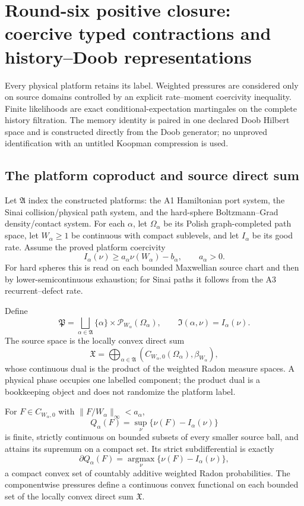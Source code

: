 \section{Round-six positive closure: coercive typed contractions and history--Doob representations}
\label{sec:r6-c2}

Every physical platform retains its label.  Weighted pressures are considered
only on source domains controlled by an explicit rate--moment coercivity
inequality.  Finite likelihoods are exact conditional-expectation martingales
on the complete history filtration.  The memory identity is paired in one
declared Doob Hilbert space and is constructed directly from the Doob
generator; no unproved identification with an untitled Koopman compression is
used.

\subsection{The platform coproduct and source direct sum}

Let \(\mathfrak A\) index the constructed platforms: the A1 Hamiltonian port
system, the Sinai collision/physical path system, and the hard-sphere
Boltzmann--Grad density/contact system.  For each \(\alpha\), let
\(\Omega_\alpha\) be its Polish graph-completed path space, let
\(W_\alpha\ge1\) be continuous with compact sublevels, and let
\(I_\alpha\) be its good rate.  Assume the proved platform coercivity
\[
I_\alpha(\nu)\ge a_\alpha\nu(W_\alpha)-b_\alpha,
\qquad a_\alpha>0.
\]
For hard spheres this is read on each bounded Maxwellian source chart and
then by lower-semicontinuous exhaustion; for Sinai paths it follows from the
A3 recurrent--defect rate.

Define
\[
\mathfrak P=\bigsqcup_{\alpha\in\mathfrak A}
\{\alpha\}\times\mathcal P_{W_\alpha}(\Omega_\alpha),
\qquad
\mathfrak I(\alpha,\nu)=I_\alpha(\nu).
\]
The source space is the locally convex direct sum
\[
\mathfrak X=\bigoplus_{\alpha\in\mathfrak A}
(C_{W_\alpha,0}(\Omega_\alpha),\beta_{W_\alpha}),
\]
whose continuous dual is the product of the weighted Radon measure spaces.
A physical phase occupies one labelled component; the product dual is a
bookkeeping object and does not randomize the platform label.

\begin{theorem}
\label{thm:r6-c2-strict}
For \(F\in C_{W_\alpha,0}\) with
\(\|F/W_\alpha\|_\infty<a_\alpha\),
\[
Q_\alpha(F)=\sup_\nu\{\nu(F)-I_\alpha(\nu)\}
\]
is finite, strictly continuous on bounded subsets of every smaller source
ball, and attains its supremum on a compact set.  Its strict subdifferential is
exactly
\[
\partial Q_\alpha(F)=
\operatorname*{argmax}_\nu
\{\nu(F)-I_\alpha(\nu)\},
\]
a compact convex set of countably additive weighted Radon probabilities.
The componentwise pressures define a continuous convex functional on each
bounded set of the locally convex direct sum \(\mathfrak X\).
\end{theorem}

